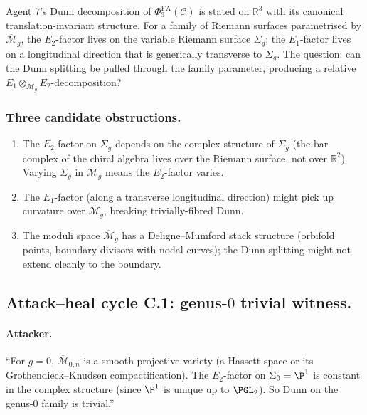 \documentclass[11pt]{article}
\newcommand{\Eone}{E_{1}}
\newcommand{\Etwo}{E_{2}}
\newcommand{\PhiFA}{\Phi^{\mathrm{FA}}}
\newcommand{\R}{\mathbb{R}}
\newcommand{\cC}{\mathcal{C}}
\newcommand{\cM}{\mathcal{M}}
\begin{document}
Agent 7's Dunn decomposition of $\PhiFA_3(\cC)$ is stated on
$\R^3$ with its canonical translation-invariant structure.
For a family of Riemann surfaces parametrised by
$\overline{\cM}_g$, the $\Etwo$-factor lives on the variable Riemann
surface $\Sigma_g$; the $\Eone$-factor lives on a longitudinal direction
that is generically transverse to $\Sigma_g$. The question: can the
Dunn splitting be pulled through the family parameter, producing a
relative $\Eone \otimes_{\overline{\cM}_g} \Etwo$-decomposition?

\subsubsection*{Three candidate obstructions.}
\begin{enumerate}[label=(C\arabic*), leftmargin=*]
\item The $\Etwo$-factor on $\Sigma_g$ depends on the complex
  structure of $\Sigma_g$ (the bar complex of the chiral algebra
  lives over the Riemann surface, not over $\R^2$). Varying $\Sigma_g$
  in $\cM_g$ means the $\Etwo$-factor varies.
\item The $\Eone$-factor (along a transverse longitudinal direction)
  might pick up curvature over $\cM_g$, breaking trivially-fibred Dunn.
\item The moduli space $\overline{\cM}_g$ has a Deligne--Mumford stack
  structure (orbifold points, boundary divisors with nodal curves); the
  Dunn splitting might not extend cleanly to the boundary.
\end{enumerate}

\subsection{Attack--heal cycle C.1: genus-$0$ trivial witness.}

\paragraph{Attacker.}
``For $g = 0$, $\overline{\cM}_{0, n}$ is a smooth projective variety
(a Hassett space or its Grothendieck--Knudsen compactification). The
$\Etwo$-factor on $\Sigma_0 = \P^1$ is constant in the complex structure
(since $\P^1$ is unique up to $\PGL_2$). So Dunn on the genus-$0$
family is trivial.''
\end{document}
